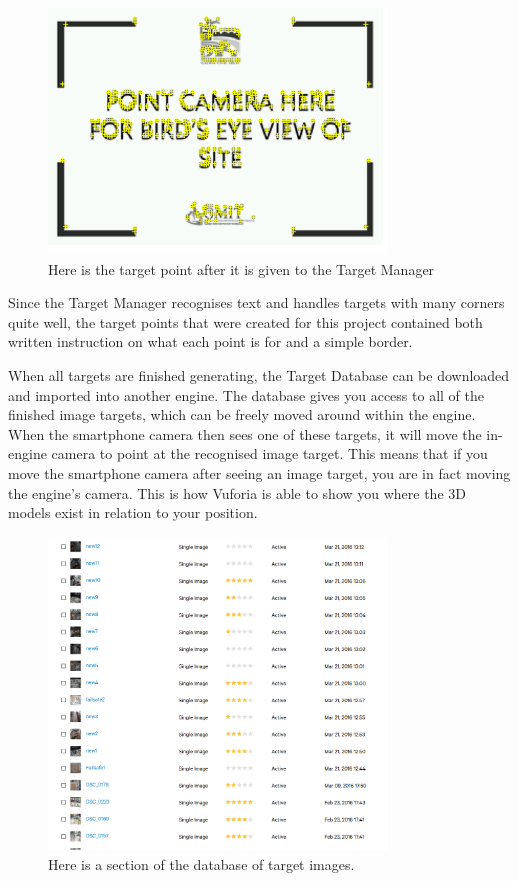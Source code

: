 \clearpage
\begin{figure}[ht!]
	\centering
	\includegraphics[width=90mm]{points}
	\caption{Here is the target point after it is given to the Target Manager \label{overflow}}
\end{figure}


Since the Target Manager recognises text and handles targets with many corners quite well, the target points that were created for this project contained both written instruction on what each point is for and a simple border. 

When all targets are finished generating, the Target Database can be downloaded and imported into another engine. The database gives you access to all of the finished image targets, which can be freely moved around within the engine. When the smartphone camera then sees one of these targets, it will move the in-engine camera to point at the recognised image target. This means that if you move the smartphone camera after seeing an image target, you are in fact moving the engine’s camera. This is how Vuforia is able to show you where the 3D models exist in relation to your position.

\begin{figure}[ht!]
	\centering
	\includegraphics[width=90mm]{database}
	\caption{Here is a section of the database of target images. \label{overflow}}
\end{figure}

